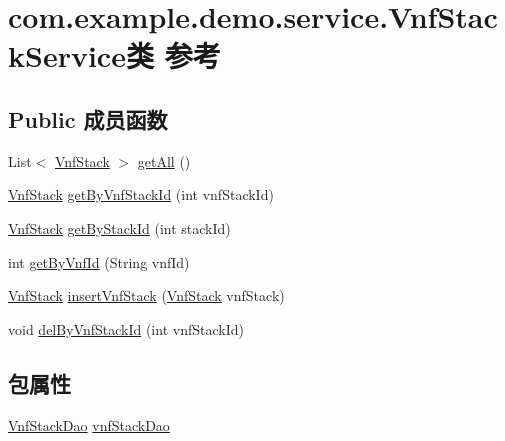 \hypertarget{classcom_1_1example_1_1demo_1_1service_1_1_vnf_stack_service}{}\section{com.\+example.\+demo.\+service.\+Vnf\+Stack\+Service类 参考}
\label{classcom_1_1example_1_1demo_1_1service_1_1_vnf_stack_service}
\subsection*{Public 成员函数}
\begin{DoxyCompactItemize}
\item 
List$<$ \mbox{\hyperlink{classcom_1_1example_1_1demo_1_1modular_1_1_vnf_stack}{Vnf\+Stack}} $>$ \mbox{\hyperlink{classcom_1_1example_1_1demo_1_1service_1_1_vnf_stack_service_ab9718be005fe1e2febe5fb85f508efe1}{get\+All}} ()
\item 
\mbox{\hyperlink{classcom_1_1example_1_1demo_1_1modular_1_1_vnf_stack}{Vnf\+Stack}} \mbox{\hyperlink{classcom_1_1example_1_1demo_1_1service_1_1_vnf_stack_service_abb986cddfad264669d09962a4acfcce1}{get\+By\+Vnf\+Stack\+Id}} (int vnf\+Stack\+Id)
\item 
\mbox{\hyperlink{classcom_1_1example_1_1demo_1_1modular_1_1_vnf_stack}{Vnf\+Stack}} \mbox{\hyperlink{classcom_1_1example_1_1demo_1_1service_1_1_vnf_stack_service_a846ea0fe6594f8d624924e4e590ddc86}{get\+By\+Stack\+Id}} (int stack\+Id)
\item 
int \mbox{\hyperlink{classcom_1_1example_1_1demo_1_1service_1_1_vnf_stack_service_aa4ff0ca38afb8a273df2f65800007de4}{get\+By\+Vnf\+Id}} (String vnf\+Id)
\item 
\mbox{\hyperlink{classcom_1_1example_1_1demo_1_1modular_1_1_vnf_stack}{Vnf\+Stack}} \mbox{\hyperlink{classcom_1_1example_1_1demo_1_1service_1_1_vnf_stack_service_a5f81358d6ef1a41d8999f11f7604520b}{insert\+Vnf\+Stack}} (\mbox{\hyperlink{classcom_1_1example_1_1demo_1_1modular_1_1_vnf_stack}{Vnf\+Stack}} vnf\+Stack)
\item 
void \mbox{\hyperlink{classcom_1_1example_1_1demo_1_1service_1_1_vnf_stack_service_a5564416ba5fb2bc1827d61a14e5bca5b}{del\+By\+Vnf\+Stack\+Id}} (int vnf\+Stack\+Id)
\end{DoxyCompactItemize}
\subsection*{包属性}
\begin{DoxyCompactItemize}
\item 
\mbox{\hyperlink{interfacecom_1_1example_1_1demo_1_1dao_1_1_vnf_stack_dao}{Vnf\+Stack\+Dao}} \mbox{\hyperlink{classcom_1_1example_1_1demo_1_1service_1_1_vnf_stack_service_aac50276cdf4ac05c50d8fc05e2aa1578}{vnf\+Stack\+Dao}}
\end{DoxyCompactItemize}



